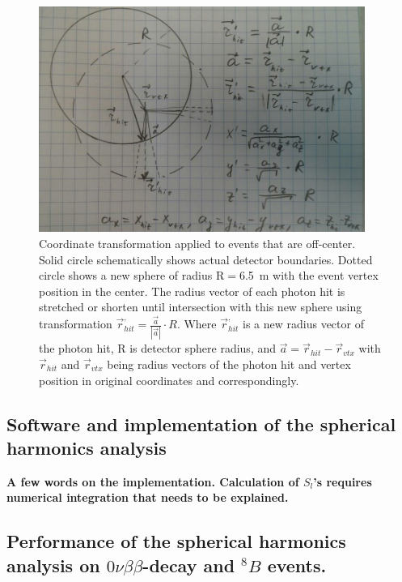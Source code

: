\documentclass[12pt,twoside,letterpaper]{article}
\newcommand{\vbb}{0\nu\beta\beta}
\newcommand{\B}{^{8}B}
\begin{document}
\begin{figure}[htb]
\centering
\includegraphics[angle=0,width=0.95\textwidth]{plots/SphH_transform_sketch.JPG}
\caption{Coordinate transformation applied to events that are off-center. Solid circle schematically shows actual detector boundaries. Dotted circle shows a new sphere of radius R$=$6.5~m with the event vertex position in the center. The radius vector of each photon hit is stretched or shorten until intersection with this new sphere using transformation $\vec{r}^{,}_{hit} = \frac{\vec{a}}{|\vec{a}|} \cdot R$. Where $\vec{r}^{,}_{hit}$ is a new radius vector of the photon hit, R is detector sphere radius, and $\vec{a}=\vec{r}_{hit} - \vec{r}_{vtx}$ with $\vec{r}_{hit}$ and $\vec{r}_{vtx}$ being radius vectors of the photon hit and vertex position in original coordinates and correspondingly.}
\label{fig:SphH_transform}
\end{figure}



\subsection{Software and implementation of the spherical harmonics analysis}
{\bf A few words on the implementation. Calculation of $S_l$'s requires numerical integration that needs to be explained.}

\subsection{Performance of the spherical harmonics analysis on $\vbb$-decay and $\B$ events.}
\end{document}
